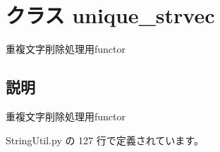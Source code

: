 \section{クラス unique\_\-strvec}
\label{classsource__py_1_1_string_util_1_1unique__strvec}
重複文字削除処理用functor  




\subsection{説明}
重複文字削除処理用functor 

 StringUtil.py の 127 行で定義されています。